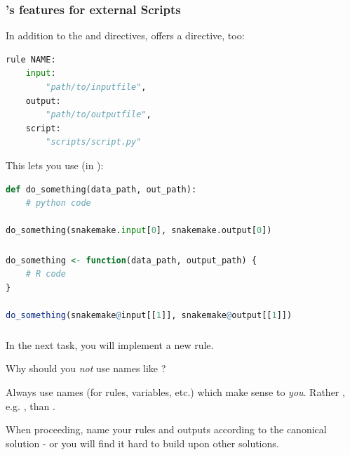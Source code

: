 \begingroup
{}
\begin{frame}[fragile]
  \frametitle{\Snakemake's features for external Scripts}
  In addition to the  and  directives, \Snakemake{} offers a  directive, too:
  \begin{lstlisting}[language=Python,style=Python]
rule NAME:
    input:
        "path/to/inputfile",
    output:
        "path/to/outputfile",
    script:
        "scripts/script.py"
  \end{lstlisting}
  This lets you use (in ):
  \begin{lstlisting}[language=Python,style=Python]
def do_something(data_path, out_path):
    # python code

do_something(snakemake.input[0], snakemake.output[0])
  \end{lstlisting}
\end{frame}
\endgroup

\begin{frame}[fragile]
  \frametitle{}
  \begin{lstlisting}[language=R,style=R]
do_something <- function(data_path, output_path) {
    # R code
}

do_something(snakemake@input[[1]], snakemake@output[[1]])
  \end{lstlisting}
\end{frame}

\begin{frame}[fragile]
	\frametitle{}
	In the next task, you will implement a new rule.
	\begin{question}
		Why should you \emph{not} use names like ?
	\end{question}
    \pause
    \begin{docs}
    	Always use names (for rules, variables, etc.) which make sense to \emph{you}. Rather , e.g. , than .
    \end{docs}
    \pause
    \begin{hint}
    	When proceeding, name your rules and outputs according to the canonical solution - or you will find it hard to build upon other solutions.
    \end{hint}
\end{frame}


